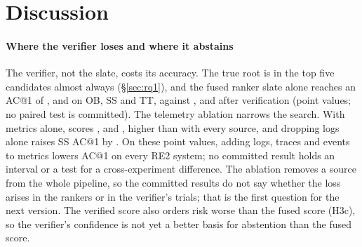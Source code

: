 \section{Discussion}
\label{sec:discussion}

\paragraph{Where the verifier loses and where it abstains}
The verifier, not the slate, costs \sys its accuracy.
The true root is in the top five candidates almost always (\S\ref{sec:rq1}), and the fused ranker slate alone reaches an AC@1 of ,  and  on OB, SS and TT, against ,  and  after verification (point values; no paired test is committed).
The telemetry ablation narrows the search.
With metrics alone,  scores ,  and , higher than with every source, and dropping logs alone raises SS AC@1 by .
On these point values, adding logs, traces and events to metrics lowers AC@1 on every RE2 system; no committed result holds an interval or a test for a cross-experiment difference.
The ablation removes a source from the whole pipeline, so the committed results do not say whether the loss arises in the rankers or in the verifier's trials; that is the first question for the next version.
The verified score also orders risk worse than the fused score (H3c), so the verifier's confidence is not yet a better basis for abstention than the fused score.

